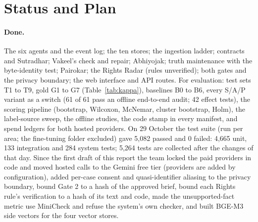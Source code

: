 \section{Status and Plan}
\label{sec:status}

\paragraph{Done.} The six agents and the event log; the ten stores; the ingestion ladder; contracts and Sutradhar; Vakeel's check and repair; Abhiyojak; truth maintenance with the byte-identity test; Pairokar; the Rights Radar (rules unverified); both gates and the privacy boundary; the web interface and API routes. For evaluation: test sets T1 to T9, gold G1 to G7 (Table~\ref{tab:kappa}), baselines B0 to B6, every S/A/P variant as a switch (61 of 61 pass an offline end-to-end audit; 42 effect tests), the scoring pipeline (bootstrap, Wilcoxon, McNemar, cluster bootstrap, Holm), the label-source sweep, the offline studies, the code stamp in every manifest, and spend ledgers for both hosted providers. On 29 October the test suite (run per area; the fine-tuning folder excluded) gave 5,082 passed and 0 failed: 4,665 unit, 133 integration and 284 system tests; 5,264 tests are collected after the changes of that day. Since the first draft of this report the team locked the paid providers in code and moved hosted calls to the Gemini free tier (providers are added by configuration), added per-case consent and quasi-identifier aliasing to the privacy boundary, bound Gate 2 to a hash of the approved brief, bound each Rights rule's verification to a hash of its text and code, made the unsupported-fact metric use MiniCheck and refuse the system's own checker, and built BGE-M3 side vectors for the four vector stores.

